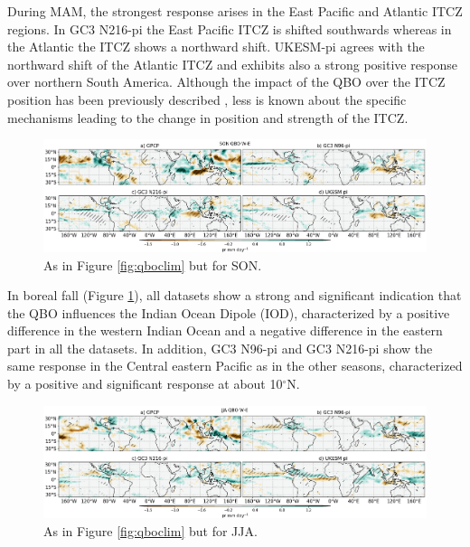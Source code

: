 During MAM, the strongest response arises in the East Pacific and Atlantic ITCZ regions. In GC3 N216-pi the East Pacific ITCZ is shifted southwards whereas in the Atlantic the ITCZ shows a northward shift. UKESM-pi agrees with the northward shift of the Atlantic ITCZ and exhibits also a strong positive response over northern South America. Although the impact of the QBO over the ITCZ position has been previously described \citep{gray2018,serva2020}, less is known about the specific mechanisms leading to the change in position and strength of the ITCZ. 


\begin{figure}[t!]
\centering
 \includegraphics[width=\linewidth]{figures/piprsonqbowqboe.png}
\caption[SON mean precipitation composite difference QBO W-E ]{ As in Figure \ref{fig:qboclim} but for SON. }
\label{fig:qboson}
\end{figure}


In boreal fall (Figure \ref{fig:qboson}), all datasets show a strong and significant indication that the QBO influences the Indian Ocean Dipole (IOD), characterized by a positive difference in the western Indian Ocean and a negative difference in the eastern part in all the datasets. In addition, GC3 N96-pi and GC3 N216-pi show the same response in the Central eastern Pacific as in the other seasons, characterized by a positive and significant response at about 10$^\circ$N.



\begin{figure}[t!]
\centering
 \includegraphics[width=\linewidth]{figures/piprjjaqbowqboe.png}
\caption[JJA mean precipitation composite difference QBO W-E ]{ As in Figure \ref{fig:qboclim} but for JJA. }
\label{fig:qbojja}
\end{figure}


